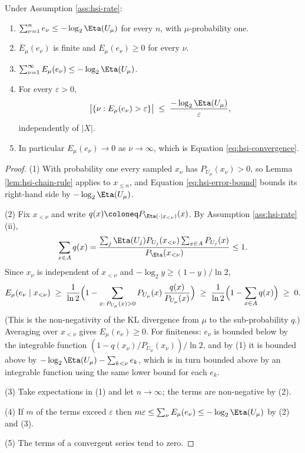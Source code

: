 \begin{theorem}
\label{thm:hsi-rate}
Under Assumption \ref{ass:hsi-rate}:
\begin{enumerate}
    \item %
    $\sum_{\nu=1}^{n} e_\nu \le -\log_2\Eta(U_\mu)$ for every $n$, with $\mu$-probability one.
    \item %
    $E_\mu(e_\nu)$ is finite and $E_\mu(e_\nu)\ge 0$ for every $\nu$.
    \item %
    $\sum_{\nu=1}^{\infty} E_\mu(e_\nu)\le -\log_2\Eta(U_\mu)$.
    \item %
    For every $\varepsilon>0$,
    \begin{equation}
    \label{eq:hsi-rate}
        \bigl|\{\nu : E_\mu(e_\nu)>\varepsilon\}\bigr| \;\le\; \frac{-\log_2\Eta(U_\mu)}{\varepsilon},
    \end{equation}
    independently of $|X|$.
    \item %
    In particular $E_\mu(e_\nu)\to 0$ as $\nu\to\infty$, which is Equation \ref{eq:hsi-convergence}.
\end{enumerate}
\end{theorem}
\begin{proof}
(1) With probability one every sampled $x_\nu$ has $P_{U_\mu}(x_\nu)>0$, so Lemma \ref{lem:hsi-chain-rule} applies to $x_{\le n}$, and Equation \ref{eq:hsi-error-bound} bounds its right-hand side by $-\log_2\Eta(U_\mu)$.

(2) Fix $x_{<\nu}$ and write $q(x)\coloneq P_{\Eta(\cdot\mid x_{<\nu})}(x)$. By Assumption \ref{ass:hsi-rate}(ii),
\[
    \sum_{x\in A}q(x)=\frac{\sum_j\Eta(U_j)P_{U_j}(x_{<\nu})\sum_{x\in A}P_{U_j}(x)}{P_\Eta(x_{<\nu})}\le 1 .
\]
Since $x_\nu$ is independent of $x_{<\nu}$ and $-\log_2 y\ge(1-y)/\ln 2$,
\[
    E_\mu(e_\nu\mid x_{<\nu})
    \;\ge\;\frac{1}{\ln 2}\Bigl(1-\sum_{x:\,P_{U_\mu}(x)>0}P_{U_\mu}(x)\,\frac{q(x)}{P_{U_\mu}(x)}\Bigr)
    \;\ge\;\frac{1}{\ln 2}\Bigl(1-\sum_{x\in A}q(x)\Bigr)\;\ge\;0 .
\]
(This is the non-negativity of the KL divergence from $\mu$ to the sub-probability $q$.) Averaging over $x_{<\nu}$ gives $E_\mu(e_\nu)\ge 0$. For finiteness: $e_\nu$ is bounded below by the integrable function $(1-q(x_\nu)/P_{U_\mu}(x_\nu))/\ln 2$, and by (1) it is bounded above by $-\log_2\Eta(U_\mu)-\sum_{k<\nu}e_k$, which is in turn bounded above by an integrable function using the same lower bound for each $e_k$.

(3) Take expectations in (1) and let $n\to\infty$; the terms are non-negative by (2).

(4) If $m$ of the terms exceed $\varepsilon$ then $m\varepsilon\le\sum_\nu E_\mu(e_\nu)\le-\log_2\Eta(U_\mu)$ by (2) and (3).

(5) The terms of a convergent series tend to zero.
\end{proof}

